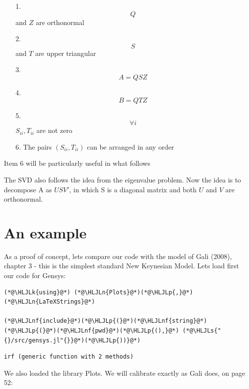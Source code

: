 \documentclass[12pt,a4paper]{article}
\newcommand{\HLJLk}[1]{\textcolor[RGB]{148,91,176}{\textbf{#1}}}
\newcommand{\HLJLn}[1]{#1}
\newcommand{\HLJLnf}[1]{\textcolor[RGB]{66,102,213}{#1}}
\newcommand{\HLJLs}[1]{\textcolor[RGB]{201,61,57}{#1}}
\newcommand{\HLJLp}[1]{#1}
\begin{document}
\begin{itemize}
\item[1. ] \[
Q
\]
and $Z$ are orthonormal


\item[2. ] \[
S
\]
and $T$ are upper triangular


\item[3. ] \[
A = QSZ
\]

\item[4. ] \[
B = QTZ
\]

\item[5. ] \[
\forall i
\]
$S_{ii}, T_{ii}$ are not zero


\item[6. ] The pairs $(S_{ii}, T_{ii})$ can be arranged in any order

\end{itemize}
Item 6 will be particularly useful in what follows

The SVD also follows the idea from the eigenvalue problem. Now the idea is to decompose A as $USV'$, in which S is a diagonal matrix and both $U$ and $V$ are orthonormal.

\section{An example}
As a proof of concept, lets compare our code with the model of Gali (2008), chapter 3 - this is the simplest standard New Keynesian Model. Lets load first our code for Gensys:


\begin{lstlisting}
(*@\HLJLk{using}@*) (*@\HLJLn{Plots}@*)(*@\HLJLp{,}@*) (*@\HLJLn{LaTeXStrings}@*)

(*@\HLJLnf{include}@*)(*@\HLJLp{(}@*)(*@\HLJLnf{string}@*)(*@\HLJLp{(}@*)(*@\HLJLnf{pwd}@*)(*@\HLJLp{(),}@*) (*@\HLJLs{"{}/src/gensys.jl"{}}@*)(*@\HLJLp{))}@*)
\end{lstlisting}

\begin{lstlisting}
irf (generic function with 2 methods)
\end{lstlisting}


We also loaded the library Plots. We will calibrate exactly as Gali does, on page 52:
\end{document}
